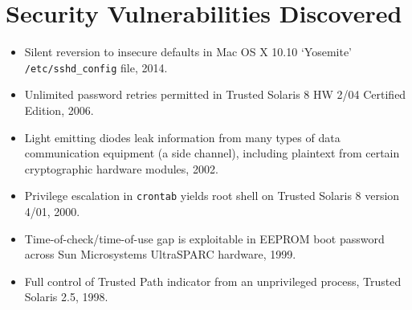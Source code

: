 \vspace{2mm}
\section*{Security Vulnerabilities Discovered}

\vspace{-3mm}
\begin{itemize}
    \item Silent reversion to insecure defaults in Mac OS X 10.10 `Yosemite'
        \texttt{/etc/sshd\_config} file, 2014.\vspace{-2mm}
	\item Unlimited password retries permitted in Trusted Solaris 8 HW 2/04
		Certified Edition, 2006.\vspace{-2mm}
	\item Light emitting diodes leak information from many types of data
		communication equipment (a side channel), including plaintext from
		certain cryptographic hardware modules, 2002.\vspace{-2mm}
	\item Privilege escalation in \verb,crontab, yields root shell on Trusted
		Solaris 8 version 4/01, 2000.\vspace{-2mm}
    \item Time-of-check/time-of-use gap is exploitable in EEPROM boot
        password across Sun Microsystems UltraSPARC hardware, 1999.\vspace{-2mm}
    \item Full control of Trusted Path indicator from an unprivileged process,
        Trusted Solaris 2.5, 1998.\vspace{-2mm}
\end{itemize}

